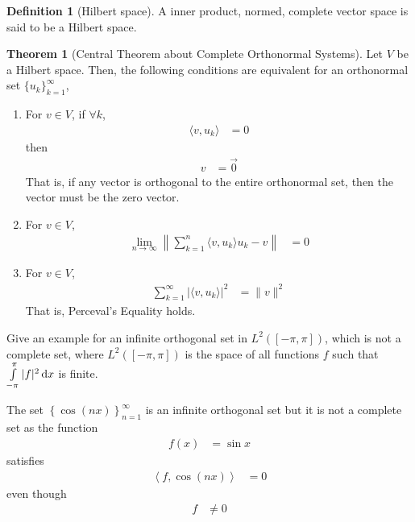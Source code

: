 \documentclass[fleqn, a4paper, 12pt, twoside]{article}
\theoremstyle{definition}
\newtheorem{definition}{Definition}
\theoremstyle{theorem}
\newtheorem{theorem}{Theorem}
\begin{document}
\begin{definition}[Hilbert space]
	A inner product, normed, complete vector space is said to be a Hilbert space.
\end{definition}

\begin{theorem}[Central Theorem about Complete Orthonormal Systems]
	Let $V$ be a Hilbert space.
	Then, the following conditions are equivalent for an orthonormal set $\{u_k\}_{k = 1}^{\infty}$,
	\begin{enumerate}
		\item
			For $v \in V$, if $\forall k$,
			\begin{align*}
				\langle v,u_k \rangle & = 0
			\end{align*}
			then
			\begin{align*}
				v & = \overrightarrow{0}
			\end{align*}
			That is, if any vector is orthogonal to the entire orthonormal set, then the vector must be the zero vector.
		\item
			For $v \in V$,
			\begin{align*}
				\lim\limits_{n \to \infty} \left\| \sum\limits_{k = 1}^{n} \langle v,u_k \rangle u_k - v \right\| & = 0
			\end{align*}
		\item
			For $v \in V$,
			\begin{align*}
				\sum\limits_{k = 1}^{\infty} \left| \langle v,u_k \rangle \right|^2 & = \|v\|^2
			\end{align*}
			That is, Perceval's Equality holds.
	\end{enumerate}
\end{theorem}

\begin{question}
	Give an example for an infinite orthogonal set in $L^2\left( [-\pi,\pi] \right)$, which is not a complete set, where $L^2\left( [-\pi,\pi] \right)$ is the space of all functions $f$ such that $\int\limits_{-\pi}^{\pi} |f|^2 \dif x$ is finite.
\end{question}

\begin{solution}
	The set $\left\{ \cos(n x) \right\}_{n = 1}^{\infty}$ is an infinite orthogonal set but it is not a complete set as the function
	\begin{align*}
		f(x) & = \sin x
	\end{align*}
	satisfies
	\begin{align*}
		\left\langle f,\cos(n x) \right\rangle & = 0
	\end{align*}
	even though
	\begin{align*}
		f & \neq 0
	\end{align*}
\end{solution}
\end{document}
